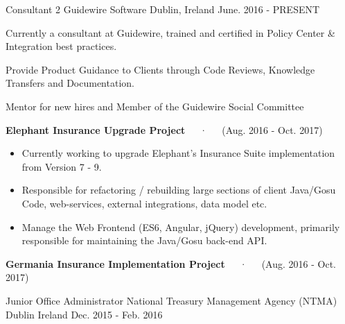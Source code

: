

\begin{cventries}
   \cventry
    {Consultant 2} %
    {Guidewire Software} %
    {Dublin, Ireland} %
    {June. 2016 - PRESENT} %
    {
    \begin{cvitems} %
    	\item {Currently a consultant at Guidewire, trained and certified in Policy Center & Integration best practices.}
    	\item {Provide Product Guidance to Clients through Code Reviews, Knowledge Transfers and Documentation.}
    	\item {Mentor for new hires and Member of the Guidewire Social Committee{~\\}}
        \item {\textbf{Elephant Insurance Upgrade Project}~~~·~~~(Aug. 2016 - Oct. 2017)}
        \begin{itemize}
		\item Currently working to upgrade Elephant's Insurance Suite implementation from Version 7 - 9.
		\item Responsible for refactoring / rebuilding large sections of client Java/Gosu Code, web-services, external integrations, data model etc.
		\item Manage the Web Frontend (ES6, Angular, jQuery) development, primarily responsible for maintaining the Java/Gosu back-end API.{~\\}
        \end{itemize}
    \item {\textbf{Germania Insurance Implementation Project}~~~·~~~(Aug. 2016 - Oct. 2017)}
      \end{cvitems}
}
  \cventry
    {Junior Office Administrator} %
    {National Treasury Management Agency (NTMA)} %
    {Dublin Ireland} %
    {Dec. 2015 - Feb. 2016} %
    {
}
\end{cventries}
